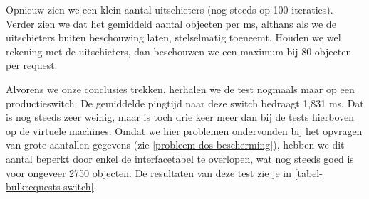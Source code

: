 Opnieuw zien we een klein aantal uitschieters (nog steeds op 100 iteraties).
Verder zien we dat het gemiddeld aantal objecten per ms, althans als we de uitschieters buiten beschouwing laten, stelselmatig toeneemt.
Houden we wel rekening met de uitschieters, dan beschouwen we een maximum bij 80 objecten per request.

Alvorens we onze conclusies trekken, herhalen we de test nogmaals maar op een productieswitch.
De gemiddelde pingtijd naar deze switch bedraagt 1,831 ms.
Dat is nog steeds zeer weinig, maar is toch drie keer meer dan bij de tests hierboven op de virtuele machines.
Omdat we hier problemen ondervonden bij het opvragen van grote aantallen gegevens (zie \cref{probleem-dos-bescherming}),
hebben we dit aantal beperkt door enkel de interfacetabel te overlopen, wat nog steeds goed is voor ongeveer 2750 objecten.
De resultaten van deze test zie je in \cref{tabel-bulkrequests-switch}.


